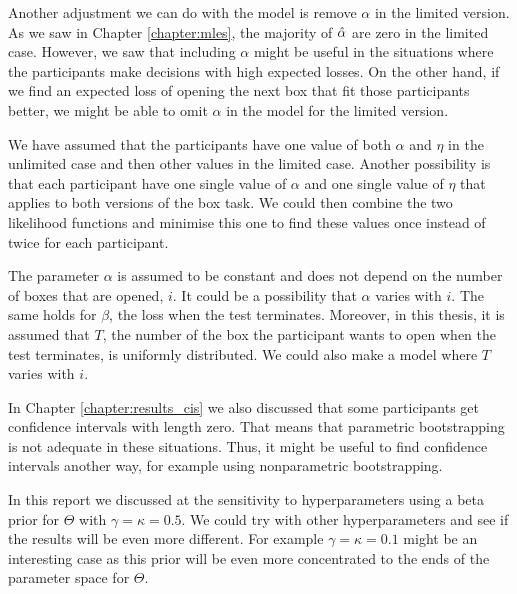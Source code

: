 Another adjustment we can do with the model is remove $\alpha$ in the limited version. As we saw in Chapter \ref{chapter:mles}, the majority of $\hat{\alpha}$ are zero in the limited case. However, we saw that including $\alpha$ might be useful in the situations where the participants make decisions with high expected losses. On the other hand, if we find an expected loss of opening the next box that fit those participants better, we might be able to omit $\alpha$ in the model for the limited version.

We have assumed that the participants have one value of both $\alpha$ and $\eta$ in the unlimited case and then other values in the limited case. Another possibility is that each participant have one single value of $\alpha$ and one single value of $\eta$ that applies to both versions of the box task. We could then combine the two likelihood functions and minimise this one to find these values once instead of twice for each participant. 

The parameter $\alpha$ is assumed to be constant and does not depend on the number of boxes that are opened, $i$. It could be a possibility that $\alpha$ varies with $i$. The same holds for $\beta$, the loss when the test terminates. Moreover, in this thesis, it is assumed that $T$, the number of the box the participant wants to open when the test terminates, is uniformly distributed. We could also make a model where $T$ varies with $i$.

In Chapter \ref{chapter:results_cis} we also discussed that some participants get confidence intervals with length zero. That means that parametric bootstrapping is not adequate in these situations. Thus, it might be useful to find confidence intervals another way, for example using nonparametric bootstrapping. 

In this report we discussed at the sensitivity to hyperparameters using a beta prior for $\Theta$ with $\gamma=\kappa=0.5$. We could try with other hyperparameters and see if the results will be even more different. For example $\gamma=\kappa=0.1$ might be an interesting case as this prior will be even more concentrated to the ends of the parameter space for $\Theta$. 


